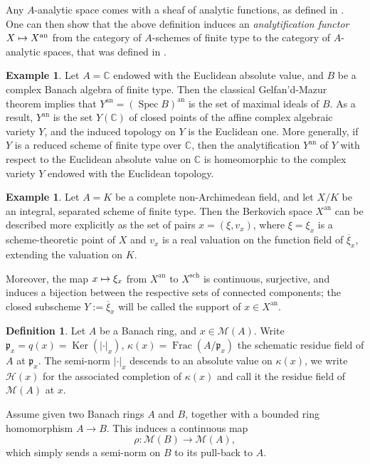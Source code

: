 \documentclass[JEP,XML,SOM,Unicode,published]{cedram}
\newcommand\mto{\mathchoice{\longmapsto}{\mapsto}{\mapsto}{\mapsto}}
\theoremstyle{definition}
\newtheorem{defn}[equation]{Definition}
\newtheorem{ex}[equation]{Example}
\newcommand \C{\mathbb C}
\newcommand \M {\mathscr {M}}
\newcommand{\an}{\mathrm{an}}
\DeclareMathOperator{\Frac}{Frac}
\DeclareMathOperator{\Ker}{Ker}
\DeclareMathOperator{\sch}{sch}
\DeclareMathOperator{\Sp}{Spec}
\begin{document}
Any $A$-analytic space comes with a sheaf of analytic functions, as defined in \cite[Def.\,1.5.3]{Ber}. One can then show that the above definition induces an \emph{analytification functor} $X \mto X^{\an}$ from the category of $A$-schemes of finite type to the category of $A$-analytic spaces, that was defined in \cite{LP}.
\begin{ex}
\label{ex GM}
Let $A = \C$ endowed with the Euclidean absolute value, and $B$ be a complex Banach algebra of finite type. Then the classical Gelfan'd-Mazur theorem implies that $Y^{\an} = (\Sp B)^{\an}$ is the set of maximal ideals of $B$. As a result, $Y^{\an}$ is the set $Y(\C)$ of closed points of the affine complex algebraic variety $Y$, and the induced topology on $Y$ is the Euclidean one. More generally, if $Y$ is a reduced scheme of finite type over $\C$, then the analytification $Y^{\an}$ of $Y$ with respect to the Euclidean absolute value on $\C$ is homeomorphic to the complex variety $Y$ endowed with the Euclidean topology.
\end{ex}

\begin{ex}
Let $A=K$ be a complete non-Archimedean field, and let $X/K$ be an integral, separated scheme of finite type. Then the Berkovich space $X^{\an}$ can be described more explicitly as the set of pairs $x=(\xi, v_x)$, where $\xi = \xi_x$ is a scheme-theoretic point of $X$ and $v_x$ is a real valuation on the function field of $\overline{\xi}_x$, extending the valuation on $K$.

Moreover, the map $x \mto \xi_x$ from $X^{\an}$ to $X^{\sch}$ is continuous, surjective, and induces a bijection between the respective sets of connected components; the closed subscheme $Y:= \overline{\xi}_x$ will be called the support of $x \in X^{\an}$.
\end{ex}
\begin{defn}
Let $A$ be a Banach ring, and $x \in \M(A)$. Write $\mathfrak{p}_x =q(x)= \Ker (\lvert \cdot \rvert_x)$, $\kappa(x) = \Frac(A/\mathfrak{p}_x)$ the schematic residue field of $A$ at $\mathfrak{p}_x$. The semi-norm $\lvert \cdot \rvert_x$ descends to an absolute value on $\kappa(x)$, we write $\mathscr{H}(x)$ for the associated completion of $\kappa(x)$ and call it the residue field of $\M(A)$ at $x$.
\end{defn}
Assume given two Banach rings $A$ and $B$, together with a bounded ring homomorphism $A\to B$. This induces a continuous map
\[
\rho: \M(B) \to \M(A),
\]
which simply sends a semi-norm on $B$ to its pull-back to $A$.
\end{document}
